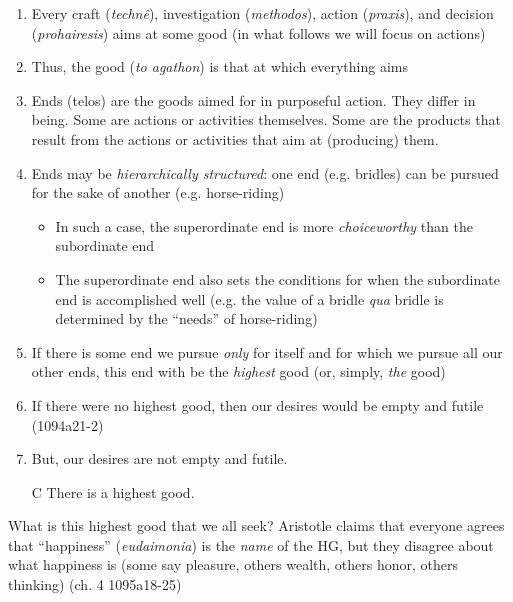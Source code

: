 \documentclass[oneside]{article}
\begin{document}
\begin{enumerate}
\item  Every craft (\emph{techn\^{e}}), investigation (\emph{methodos}), action (\emph{praxis}), and decision (\emph{prohairesis}) aims at some good (in what follows we will focus on actions)

\item Thus, the good (\emph{to agathon}) is that at which everything aims
\item  Ends (telos) are the goods aimed for in purposeful action. They differ in being. Some  are actions or activities themselves. Some are the products that result from the actions or activities that aim at (producing) them.

\item Ends may be \emph{hierarchically structured}: one end (e.g. bridles) can be pursued for the sake of another (e.g. horse-riding)
\begin{itemize}\item{In such a case, the superordinate end is more \emph{choiceworthy} than the subordinate end}\item{The superordinate end also sets the conditions for when the subordinate end is accomplished well (e.g. the value of a bridle \emph{qua} bridle is determined by the ``needs'' of horse-riding)}\end{itemize}

\item If there is some end we pursue \emph{only} for itself and for which we pursue all our other ends, this end with be the \emph{highest} good (or, simply, \emph{the} good) 

\item If there were no highest good, then our desires would be empty and futile (1094a21-2) 

\item But, our desires are not empty and futile. 
\item[C] There is a highest good. 
\end{enumerate}
What is this highest good that we all seek? Aristotle claims that everyone agrees that ``happiness'' (\emph{eudaimonia}) is the \emph{name} of the HG, but they disagree about what happiness is (some say pleasure, others wealth, others honor, others thinking) (ch. 4 1095a18-25)

\end{document}
